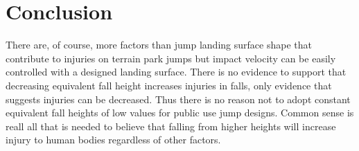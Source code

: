 \documentclass{article}
\begin{document}
\section{Conclusion}
%
There are, of course, more factors than jump landing surface shape that
contribute to injuries on terrain park jumps but impact velocity can be easily
controlled with a designed landing surface. There is no evidence to support
that decreasing equivalent fall height increases injuries in falls, only
evidence that suggests injuries can be decreased. Thus there is no reason not
to adopt constant equivalent fall heights of low values for public use jump
designs. Common sense is reall all that is needed to believe that falling from
higher heights will increase injury to human bodies regardless of other
factors.



\end{document}
